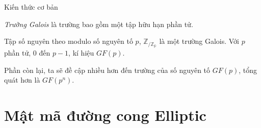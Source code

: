 \documentclass [xcolor=svgnames, t] {beamer}
\theoremstyle{definition}
\begin{document}
\begin{frame}{Kiến thức cơ bản}
    \begin{definition}
        \textit{Trường Galois} là trường bao gồm một tập hữu hạn phần tử.
    \end{definition}
    \begin{example}
        Tập số nguyên theo modulo số nguyên tố $p$, $\mathbb{Z}_{/\mathbb{Z_p}}$ là một trường Galois. Với $p$ phần tử, $0$ đến $p-1$,
        kí hiệu $GF(p)$.
    \end{example}
    Phần còn lại, ta sẽ đề cập nhiều hơn đến trường của số nguyên tố $GF(p)$, tổng quát hơn là $GF(p^n)$.
\end{frame}
\section{Mật mã đường cong Elliptic}
\end{document}
